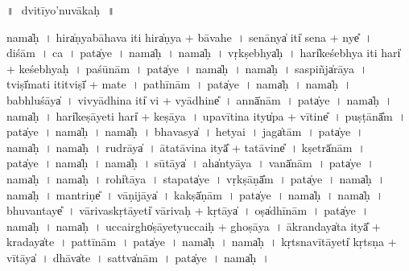 \documentclass[parskip, DIV=14]{scrartcl}
\begin{document}
\LARGE
{\centering ॥\,~dvitīyo'nuvākaḥ\,~॥\\}
\Large
\vspace{0.5cm}

nama̍ḥ~। hira̍ṇyabāhava॒ iti॒ hira̍ṇya + bā॒va॒he॒~। se॒nā॒nya̍ iti̍ sena + nye̎~। di॒śām~। ca॒~। pata̍ye~। nama̍ḥ~।
nama̍ḥ~। vṛ॒kṣebhya̍ḥ~। hari̍keśebhya॒ iti॒ hari̍ + ke॒śe॒bhya॒ḥ~। pa॒śū॒nām~। pata̍ye~। nama̍ḥ~।
nama̍ḥ~। sa॒spiñja̍rāya~। tviṣī̍mati॒ iti॒tviṣī̍ + ma॒te॒~। pa॒thī॒nām~। pata̍ye~। nama̍ḥ~।
nama̍ḥ~। ba॒bhlu॒śāya̍~। vi॒vyā॒dhina॒ iti̍ vi + vyā॒dhine̎~। annā̍nām~। pata̍ye~। nama̍ḥ~।
nama̍ḥ~। hari̍keṣā॒yeti॒ hari̍ + ke॒ṣā॒ya॒~। u॒pa॒vī॒tina॒ ityu̍pa + vī॒tine̎~। pu॒ṣṭānā̎m~। pata̍ye~। nama̍ḥ~।
nama̍ḥ~। bha॒vasya̍~। he॒tyai~। jaga̍tām~। pata̍ye~। nama̍ḥ~।
nama̍ḥ~। ru॒drāya̍~। ā॒ta॒tā॒vina॒ ityā̎ + ta॒tā॒vine̎~। kṣetrā̍nām~। pata̍ye~। nama̍ḥ~।
nama̍ḥ~। sū॒tāya̍~। aha̍ntyāya~। vanā̍nām~। pata̍ye~। nama̍ḥ~।
nama̍ḥ~। rohi̍tāya~। sta॒pata̍ye~। vṛ॒kṣāṇā̎m~। pata̍ye~। nama̍ḥ~।
nama̍ḥ~। ma॒ntriṇe̎~। vā॒ṇi॒jāya̍~। kakṣā̍ṇām~। pata̍ye~। nama̍ḥ~।
nama̍ḥ~। bhu॒va॒ntaye̎~। vā॒ri॒va॒skṛ॒tāyeti̍ vārivaḥ + kṛ॒tāya̍~। oṣa̍dhīnām~। pata̍ye~। nama̍ḥ~।
nama̍ḥ~। u॒ccairgho̍ṣāyetyu॒ccaiḥ + gho॒ṣā॒ya॒~। ā॒kra॒ndaya̍ta॒ ityā̎ + kra॒daya̍te~। pa॒ttī॒nām~। pata̍ye~। nama̍ḥ~।
nama̍ḥ~। kṛ॒tsna॒vī॒tāyeti̍ kṛtsṇa + vī॒tāya̍~। dhāva̍te~। sattva̍nām~। pata̍ye~। nama̍ḥ~।
\end{document}
